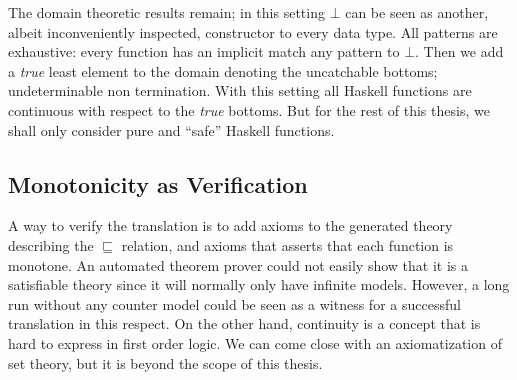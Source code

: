 The domain theoretic results remain; in this setting $\bot$ can be
seen as another, albeit inconveniently inspected, constructor to every
data type. All patterns are exhaustive: every function has an implicit
match any pattern to $\bot$.  Then we add a \emph{true} least element
to the domain denoting the uncatchable bottoms; undeterminable non
termination. With this setting all Haskell functions are continuous
with respect to the \emph{true} bottoms. But for the rest of this
thesis, we shall only consider pure and ``safe'' Haskell functions.

\subsection{Monotonicity as Verification}

A way to verify the translation is to add axioms to the generated
theory describing the $\sqsubseteq$ relation, and axioms that asserts
that each function is monotone. An automated theorem prover could not
easily show that it is a satisfiable theory since it will normally
only have infinite models. However, a long run without any counter
model could be seen as a witness for a successful translation in this
respect.  On the other hand, continuity is a concept that is hard to
express in first order logic. We can come close with an axiomatization
of set theory, but it is beyond the scope of this thesis.
